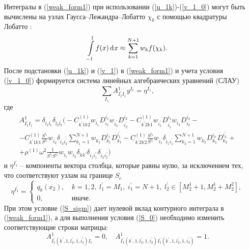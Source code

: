 \documentclass[press]{vestnik}
\begin{document}
Интегралы в (\ref{weak_form1}) при использовании (\ref{u_1k})-(\ref{v_1_0}) могут быть вычислены на узлах Гаусса--Лежандра--Лобатто $\chi_{k}$ с помощью квадратуры Лобатто \cite{Ostachowicz}:
$$
\int\limits_{-1}^{1} f(x) \d x \approx \sum_{k=1}^{N+1} w_k f(\chi_{k}).
$$
После подстановки (\ref{u_1k}) и (\ref{v_1}) в (\ref{weak_form1}) и учета условия (\ref{v_1_0}) формируется система линейных алгебраических уравнений (СЛАУ)
$$
\sum_{I_1} A_{I_{1}^{'} I_{1}^{}}^{1} y^{I_1} = \eta_{}^{{I_{1}^{'}}},
$$
где
\begin{multline}
	A_{I_{1}^{'} I_{1}^{}}^{1} = \delta_{l_{1}^{} l_{1}^{'}} \delta_{l_{2}^{} l_{2}^{'}} 
	\Bigg( 
	-C_{k^{'}1k^{}2}^{(1)} w_{i_{1}}^{} D_{i_{1}}^{i_{1}^{'}} w_{i_{2}^{'}} D_{i_{2}^{'}}^{i_{2}}
	-C_{k^{'}2k^{}1}^{(1)} w_{i_{1}^{'}} D_{i_{1}^{'}}^{i_{1}} w_{i_{2}}^{} D_{i_{2}}^{i_{2}^{'}}-
	\\
	-C_{k^{'}1k^{}1}^{(1)} \frac{S^{l_{1}}}{S^{l_{2}}} w_{i_{2}}^{} \delta_{i_{2}^{} i_{2}^{'}} \sum_{k_{1}=1}^{N+1} w_{k_{1}}^{} D_{k_{1}}^{i_{1}^{}} D_{k_{1}}^{i_{1}^{'}}
	-C_{k^{'}2k^{}2}^{(1)} \frac{S^{l_2}}{S^{l_1}} w_{i_1}^{} \delta_{i_{1}^{} i_{1}^{'}} \sum_{k_{2}=1}^{N+1} w_{k_{2}}^{} D_{k_{2}}^{i_{2}^{}} D_{k_{2}}^{i_{2}^{'}}+
	\\
	+\rho^{(1)} \omega^{2} \frac{1}{S^{l_{1}}S^{l_{2}}} w_{i_{1}}^{} w_{i_{2}}^{} \delta_{k^{} k^{'}} \delta_{i_{1}^{} i_{1}^{'}} \delta_{i_{2}^{} i_{2}^{'}}
	\Bigg)
\end{multline}
и $\eta_{}^{{I_{1}^{'}}}$ -- компоненты вектора столбца, которые равны нулю, за исключением тех, что соответствуют узлам на границе $S_{c}$
$$
\eta_{}^{{I_{1}^{'}}}= 
\left\{ 
\begin{array}{cl}
	q_{k}(x_{2}), &\ k=1,2, \; l_{1}^{'}=M_{1}, \; i_{1}^{'}=N+1, \; l_{2}^{'} \in [M_{2}^{1}+1, M_{2}^{1}+M_{2}^{2}], \\
	0, &\ иначе.
\end{array} 
\right.
$$
При этом условие (\ref{S_sigm}) дает нулевой вклад контурного интеграла в (\ref{weak_form1}), а для выполнения условия (\ref{S_0}) необходимо изменить соответствующие строки матрицы:
$$
A_{I_{1}^{'}(k^{'},1,l_{2}^{'},1,i_{2}^{'}) I_{1}^{}}^{1} = 0, \quad A_{I_{1}^{'}(k^{'},1,l_{2}^{'},1,i_{2}^{'}) I_{1}^{'}(k^{'},1,l_{2}^{'},1,i_{2}^{'})}^{1} = 1.
$$
\end{document}

